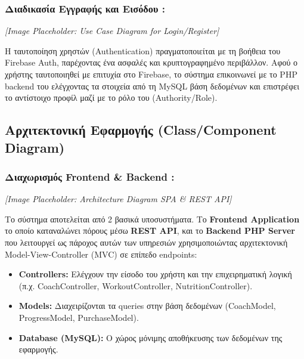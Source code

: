 \documentclass[12pt,a4paper]{report}
\begin{document}
\subsubsection{Διαδικασία Εγγραφής και Εισόδου :}

\begin{center}
    \textit{[Image Placeholder: Use Case Diagram for Login/Register]}
\end{center}

Η ταυτοποίηση χρηστών (Authentication) πραγματοποιείται με τη βοήθεια του Firebase Auth, παρέχοντας ένα ασφαλές και κρυπτογραφημένο περιβάλλον. Αφού ο χρήστης ταυτοποιηθεί με επιτυχία στο Firebase, το σύστημα επικοινωνεί με το PHP backend του ελέγχοντας τα στοιχεία από τη MySQL βάση δεδομένων και επιστρέφει το αντίστοιχο προφίλ μαζί με το ρόλο του (Authority/Role).

\subsection{Αρχιτεκτονική Εφαρμογής (Class/Component Diagram)}
\subsubsection{Διαχωρισμός Frontend \& Backend :}

\begin{center}
    \textit{[Image Placeholder: Architecture Diagram SPA \& REST API]}
\end{center}

Το σύστημα αποτελείται από 2 βασικά υποσυστήματα. Το \textbf{Frontend Application} το οποίο καταναλώνει πόρους μέσω \textbf{REST API}, και το \textbf{Backend PHP Server} που λειτουργεί ως πάροχος αυτών των υπηρεσιών χρησιμοποιώντας αρχιτεκτονική Model-View-Controller (MVC) σε επίπεδο endpoints:
\begin{itemize}
    \item \textbf{Controllers:} Ελέγχουν την είσοδο του χρήστη και την επιχειρηματική λογική (π.χ. \textenglish{CoachController, WorkoutController, NutritionController}).
    \item \textbf{Models:} Διαχειρίζονται τα queries στην βάση δεδομένων (\textenglish{CoachModel, ProgressModel, PurchaseModel}).
    \item \textbf{Database (MySQL):} Ο χώρος μόνιμης αποθήκευσης των δεδομένων της εφαρμογής.
\end{itemize}

\newpage

\end{document}
